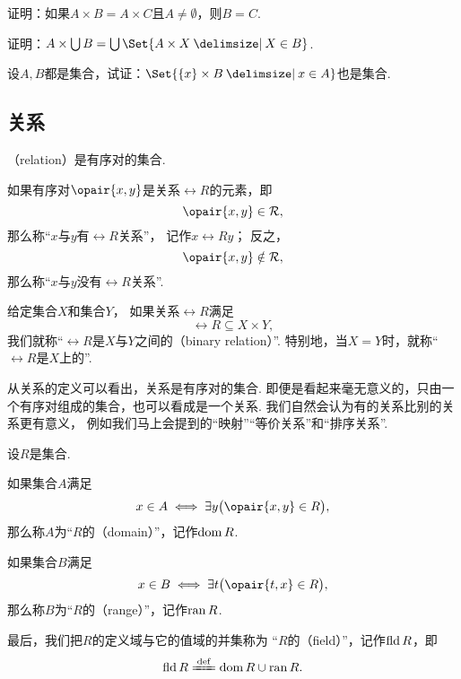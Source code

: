 \begin{example}
证明：如果\(A \times B = A \times C\)且\(A \neq \emptyset\)，则\(B = C\).
\end{example}

\begin{example}
证明：\(A \times \bigcup B = \bigcup\Set{ A \times X \given X \in B }\).
\end{example}

\begin{example}
设\(A,B\)都是集合，试证：\(\Set{ \{x\} \times B \given x \in A }\)也是集合.
\end{example}

\subsection{关系}
\begin{definition}
（relation）是有序对的集合.
\end{definition}

如果有序对\(\opair{x,y}\)是关系\(\rel{R}\)的元素，即\[
	\opair{x,y} \in \rel{R},
\]
那么称“\(x\)与\(y\)有\(\rel{R}\)关系”，
记作\(x\rel{R}y\)；
反之，\[
	\opair{x,y} \notin \rel{R},
\]
那么称“\(x\)与\(y\)没有\(\rel{R}\)关系”.

给定集合\(X\)和集合\(Y\)，
如果关系\(\rel{R}\)满足\[
	\rel{R} \subseteq X \times Y,
\]
我们就称“\(\rel{R}\)是\(X\)与\(Y\)之间的（binary relation）”.
特别地，当\(X = Y\)时，就称“\(\rel{R}\)是\(X\)上的”.

从关系的定义可以看出，关系是有序对的集合.
即便是看起来毫无意义的，只由一个有序对组成的集合，也可以看成是一个关系.
我们自然会认为有的关系比别的关系更有意义，
例如我们马上会提到的“映射”“等价关系”和“排序关系”.

\begin{definition}\label{definition:集合论.定义域与值域的定义}
设\(R\)是集合.

如果集合\(A\)满足\[
	x \in A \iff \exists y \bigl( \opair{x,y} \in R \bigr),
\]
那么称\(A\)为“\(R\)的（domain）”，记作\(\operatorname{dom} R\).

如果集合\(B\)满足\[
	x \in B \iff \exists t \bigl( \opair{t,x} \in R \bigr),
\]
那么称\(B\)为“\(R\)的（range）”，记作\(\operatorname{ran} R\).

最后，我们把\(R\)的定义域与它的值域的并集称为
“\(R\)的（field）”，记作\(\operatorname{fld} R\)，即\[
	\fld R \defeq \dom R \cup \ran R.
\]
\end{definition}

